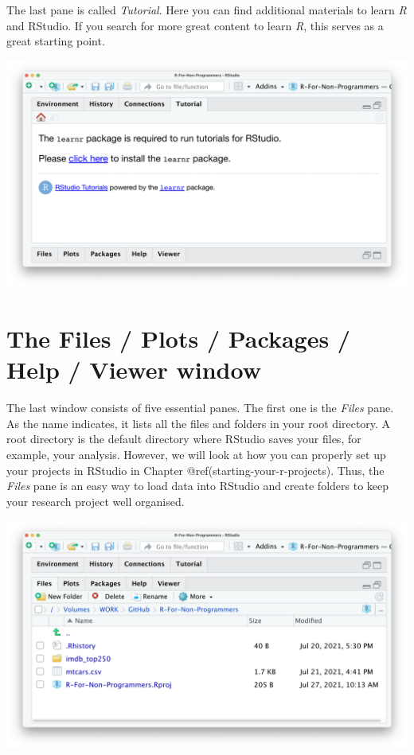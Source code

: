 \documentclass[
  letterpaper,
]{krantz}
\begin{document}
The last pane is called \emph{Tutorial}. Here you can find additional
materials to learn \emph{R} and RStudio. If you search for more great
content to learn \emph{R}, this serves as a great starting point.

\includegraphics{images/chapter_04_img/04_environment_history_etc/04_rstudio_tutorial.png}

\section{The Files / Plots / Packages / Help / Viewer
window}\label{sec-the-files-plots-packages-help-viewer-window}

The last window consists of five essential panes. The first one is the
\emph{Files} pane. As the name indicates, it lists all the files and
folders in your root directory. A root directory is the default
directory where RStudio saves your files, for example, your analysis.
However, we will look at how you can properly set up your projects in
RStudio in Chapter @ref(starting-your-r-projects). Thus, the
\emph{Files} pane is an easy way to load data into RStudio and create
folders to keep your research project well organised.

\includegraphics{images/chapter_04_img/05_files_plots_etc/01_rstudio_files.png}
\end{document}
